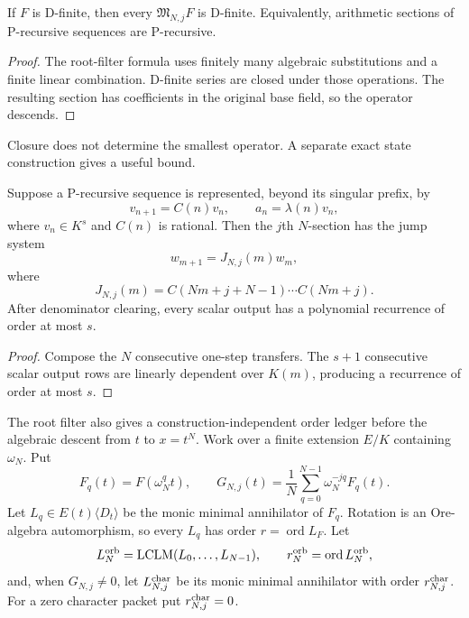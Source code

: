 \begin{theorem}
\label{thm:block09-multisection-closure}
If $F$ is D-finite, then every $\mathfrak M_{N,j}F$ is D-finite.  Equivalently, arithmetic sections of P-recursive sequences are P-recursive.
\end{theorem}

\begin{proof}
The root-filter formula uses finitely many algebraic substitutions and a finite linear combination.  D-finite series are closed under those operations.  The resulting section has coefficients in the original base field, so the operator descends.
\end{proof}

Closure does not determine the smallest operator.  A separate exact state construction gives a useful bound.

\begin{theorem}
\label{thm:block09-state-jump}
Suppose a P-recursive sequence is represented, beyond its singular prefix, by
\[
 v_{n+1}=C(n)v_n,
 \qquad
 a_n=\lambda(n)v_n,
\]
where $v_n\in K^s$ and $C(n)$ is rational.  Then the $j$th $N$-section has the jump system
\[
 \boxed{
 w_{m+1}=J_{N,j}(m)w_m,}
\]
where
\[
 \boxed{
 J_{N,j}(m)
 =
 C(Nm+j+N-1)\cdots C(Nm+j).}
\]
After denominator clearing, every scalar output has a polynomial recurrence of order at most $s$.
\end{theorem}

\begin{proof}
Compose the $N$ consecutive one-step transfers.  The $s+1$ consecutive scalar output rows are linearly dependent over $K(m)$, producing a recurrence of order at most $s$.
\end{proof}

The root filter also gives a construction-independent order ledger before the algebraic descent from $t$ to $x=t^N$.  Work over a finite extension $E/K$ containing $\omega_N$.  Put
\[
 F_q(t)=F(\omega_N^qt),
 \qquad
 G_{N,j}(t)=\frac1N\sum_{q=0}^{N-1}\omega_N^{-jq}F_q(t).
\]
Let $L_q\in E(t)\langle D_t\rangle$ be the monic minimal annihilator of $F_q$.  Rotation is an Ore-algebra automorphism, so every $L_q$ has order $r=\operatorname{ord}L_F$.  Let
\[
 L_N^{\rm orb}=\operatorname{LCLM}(L_0,\ldots,L_{N-1}),
 \qquad
 r_N^{\rm orb}=\operatorname{ord}L_N^{\rm orb},
\]
and, when $G_{N,j}\neq0$, let $L_{N,j}^{\rm char}$ be its monic minimal annihilator with order $r_{N,j}^{\rm char}$.  For a zero character packet put $r_{N,j}^{\rm char}=0$.


